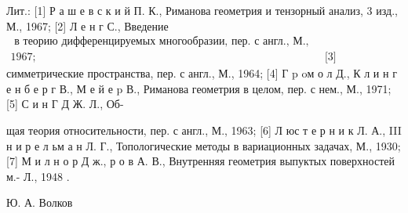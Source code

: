 \documentclass[10pt]{article}
\begin{document}
Лит.: [1] Р а ш е в с к и й П. К., Риманова геометрия и тензорный анализ, 3 изд., М., 1967; [2] Л е н г С., Введение $\begin{array}{ll}\text { в теорию дифференцируемых многообразии, пер. с англ., М., } \\ 1967 ; & \text { [3] }\end{array}$ симметрические пространства, пер. с англ., М., 1964; [4] Г p oм о л Д., К л и н г е н б е р г В., М е й е p В., Риманова геометрия в целом, пер. с нем., М., 1971; [5] С и н Г Д Ж. Л., Об-

щая теория относительности, пер. с англ., М., 1963; [6] Л юс т е р н и к Л. А., III н и р е л ьм а н Л. Г., Топологические методы в вариационных задачах, М., 1930; [7] М и л н о р Д ж., р о в А. В., Внутренняя геометрия выпуктых поверхностей м.- Л., 1948 .



Ю. А. Волков
\end{document}
